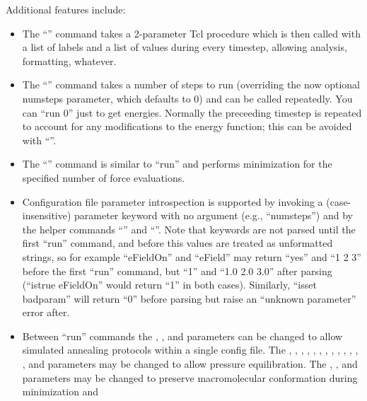 Additional features include:
\begin{itemize}
 \item The ``'' command takes a 2-parameter Tcl procedure which
    is then called with a list of labels and a list of values during
    every timestep, allowing analysis, formatting, whatever.
 \item The ``'' command takes a number of steps to run (overriding the
    now optional numsteps parameter, which defaults to 0) and can be
    called repeatedly.  You can ``run 0'' just to get energies.
    Normally the preceeding timestep is repeated to account for any modifications to the
    energy function; this can be avoided with ``''.
 \item The ``'' command is similar to ``run'' and performs
    minimization for the specified number of force evaluations.
 \item Configuration file parameter introspection is supported by
   invoking a (case-insensitive) parameter keyword with no argument (e.g., ``numsteps'')
   and by the helper commands ``'' and ``''.
   Note that keywords are not parsed until the first ``run'' command, and
   before this values are treated as unformatted strings, so for example
   ``eFieldOn'' and ``eField'' may return ``yes'' and ``1 2 3'' before
   the first ``run'' command, but ``1'' and ``1.0 2.0 3.0'' after parsing
   (``istrue eFieldOn'' would return ``1'' in both cases).
   Similarly, ``isset badparam'' will return ``0'' before parsing
   but raise an ``unknown parameter'' error after.
 \item Between ``run'' commands the ,
    , and
     parameters can be changed to allow simulated
    annealing protocols within a single config file.
    The , ,
    , ,
    , ,
    , ,
    , ,
    , ,
    , and
    parameters may be changed to allow pressure equilibration.
    The , , and
     parameters may be
    changed to preserve macromolecular conformation during minimization and

\end{itemize}

